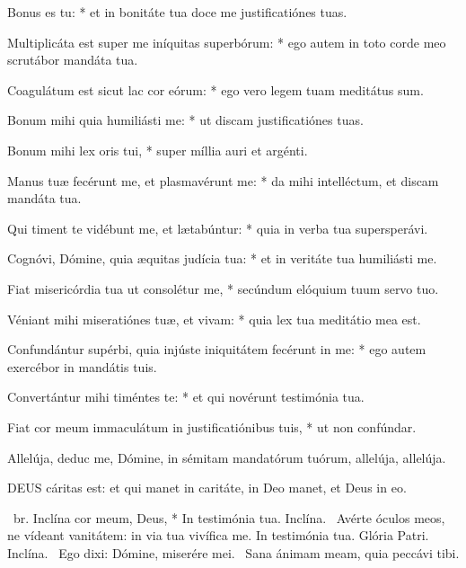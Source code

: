 Bonus es tu: * et in bonitáte tua doce me justificatiónes tuas.

Multiplicáta est super me iníquitas superbórum: * ego autem in toto corde meo scrutábor mandáta tua.

Coagulátum est sicut lac cor eórum: * ego vero legem tuam meditátus sum.

Bonum mihi quia humiliásti me: * ut discam justificatiónes tuas.

Bonum mihi lex oris tui, * super míllia auri et argénti.

Manus tuæ fecérunt me, et plasmavérunt me: * da mihi intelléctum, et discam mandáta tua.

Qui timent te vidébunt me, et lætabúntur: * quia in verba tua supersperávi.

Cognóvi, Dómine, quia æquitas judícia tua: * et in veritáte tua humiliásti me.

Fiat misericórdia tua ut consolétur me, * secúndum elóquium tuum servo tuo.

Véniant mihi miseratiónes tuæ, et vivam: * quia lex tua meditátio mea est.

Confundántur supérbi, quia injúste iniquitátem fecérunt in me: * ego autem exercébor in mandátis tuis.

Convertántur mihi timéntes te: * et qui novérunt testimónia tua.

Fiat cor meum immaculátum in justificatiónibus tuis, * ut non confúndar.

 Allelúja, deduc me, Dómine, in sémitam mandatórum tuórum, allelúja, allelúja.


\lettrine[lines=2]{D}{EUS} cáritas est: et qui manet in caritáte, in Deo manet, et Deus in eo.

\R\ br. Inclína cor meum, Deus, * In testimónia tua. Inclína. \V\ Avérte óculos meos, ne vídeant vanitátem: in via tua vivífica me. In testimónia tua. Glória Patri. Inclína. \V\ Ego dixi: Dómine, miserére mei. \R\ Sana ánimam meam, quia peccávi tibi.


